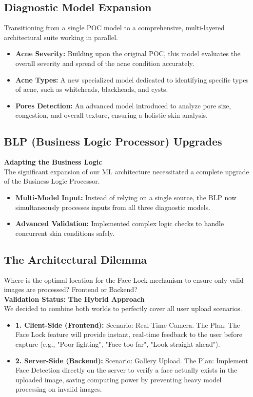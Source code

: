 \documentclass[12pt,a4paper]{article}
\begin{document}
\subsection{Diagnostic Model Expansion}
Transitioning from a single POC model to a comprehensive, multi-layered architectural suite working in parallel.
\begin{itemize}
    \item \textbf{Acne Severity:} Building upon the original POC, this model evaluates the overall severity and spread of the acne condition accurately.
    \item \textbf{Acne Types:} A new specialized model dedicated to identifying specific types of acne, such as whiteheads, blackheads, and cysts.
    \item \textbf{Pores Detection:} An advanced model introduced to analyze pore size, congestion, and overall texture, ensuring a holistic skin analysis.
\end{itemize}

\subsection{BLP (Business Logic Processor) Upgrades}
\textbf{Adapting the Business Logic}\\
The significant expansion of our ML architecture necessitated a complete upgrade of the Business Logic Processor.
\begin{itemize}
    \item \textbf{Multi-Model Input:} Instead of relying on a single source, the BLP now simultaneously processes inputs from all three diagnostic models.
    \item \textbf{Advanced Validation:} Implemented complex logic checks to handle concurrent skin conditions safely.
\end{itemize}

\subsection{The Architectural Dilemma}
Where is the optimal location for the Face Lock mechanism to ensure only valid images are processed? Frontend or Backend?\\
\textbf{Validation Status: The Hybrid Approach}\\
We decided to combine both worlds to perfectly cover all user upload scenarios.
\begin{itemize}
    \item \textbf{1. Client-Side (Frontend):} Scenario: Real-Time Camera. The Plan: The Face Lock feature will provide instant, real-time feedback to the user before capture (e.g., "Poor lighting", "Face too far", "Look straight ahead").
    \item \textbf{2. Server-Side (Backend):} Scenario: Gallery Upload. The Plan: Implement Face Detection directly on the server to verify a face actually exists in the uploaded image, saving computing power by preventing heavy model processing on invalid images.
\end{itemize}
\end{document}
